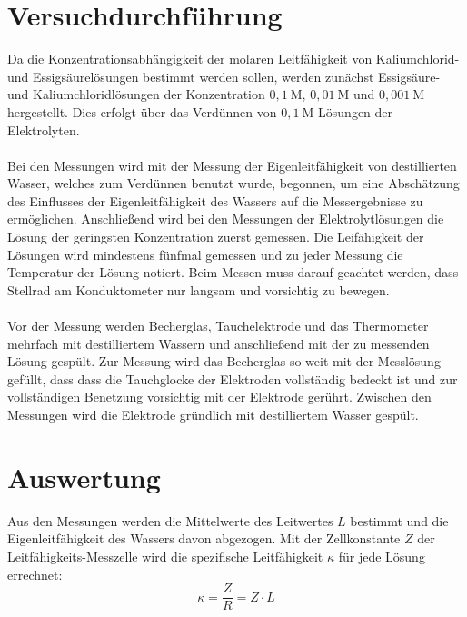 \documentclass[12pt,a4paper,titlepage,headinclude,bibtotoc]{scrartcl}
\begin{document}
\section{Versuchdurchführung}
Da die Konzentrationsabhängigkeit der molaren Leitfähigkeit von Kaliumchlorid- und Essigsäurelösungen bestimmt werden sollen, werden zunächst Essigsäure- und Kaliumchloridlösungen der Konzentration $0,1 {~}\mathrm{M}$, $0,01{~}\mathrm{M}$ und $0,001{~}\mathrm{M}$ hergestellt. Dies erfolgt über das Verdünnen von $0,1{~}\mathrm{M}$ Lösungen der Elektrolyten.\\\\
Bei den Messungen wird mit der Messung der Eigenleitfähigkeit von destillierten Wasser, welches zum Verdünnen benutzt wurde, begonnen, um eine Abschätzung des Einflusses der Eigenleitfähigkeit des Wassers auf die Messergebnisse zu ermöglichen. Anschließend wird bei den Messungen der Elektrolytlösungen die Lösung der geringsten Konzentration zuerst gemessen. Die Leifähigkeit der Lösungen wird mindestens fünfmal gemessen und zu jeder Messung die Temperatur der Lösung notiert. Beim Messen muss darauf geachtet werden, dass Stellrad am Konduktometer nur langsam und vorsichtig zu bewegen.\\\\
Vor der Messung werden Becherglas, Tauchelektrode und das Thermometer mehrfach mit destilliertem Wassern und anschließend mit der zu messenden Lösung gespült. Zur Messung wird das Becherglas so weit mit der Messlösung gefüllt, dass dass die Tauchglocke der Elektroden vollständig bedeckt ist und zur vollständigen Benetzung vorsichtig mit der Elektrode gerührt. Zwischen den Messungen wird die Elektrode gründlich mit destilliertem Wasser gespült.



\newpage

\section{Auswertung}

Aus den Messungen werden die Mittelwerte des Leitwertes $L$ bestimmt und die Eigenleitfähigkeit des Wassers davon abgezogen. Mit der Zellkonstante $Z$ der Leitfähigkeits-Messzelle wird die spezifische Leitfähigkeit $\kappa$ für jede Lösung errechnet:\\

\begin{equation}
\kappa = \frac{Z}{R} = Z \cdot L
\end{equation}
\end{document}
